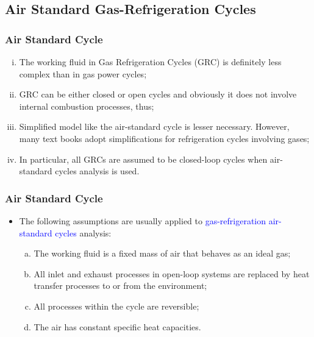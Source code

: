 \documentclass[10pt,compress]{beamer}
\begin{document}
\subsection{Air Standard Gas-Refrigeration Cycles}
\begin{frame}
 \frametitle{Air Standard Cycle}
  \begin{enumerate}[(i)]
   \item <1-> The working fluid in Gas Refrigeration Cycles (GRC) is definitely less complex than in gas power cycles;
   \item <2-> GRC can be either closed or open cycles and obviously it does not involve internal combustion processes, thus;
   \item <3-> Simplified model like the air-standard cycle is lesser necessary. However, many text books adopt simplifications for refrigeration cycles involving gases;
   \item <4-> In particular, all GRCs are assumed to be closed-loop cycles when air-standard cycles analysis is used.
  \end{enumerate}
\end{frame}

\begin{frame}
 \frametitle{Air Standard Cycle}
   \begin{itemize}
   \item <1-> The following assumptions are usually applied to \textcolor{blue}{gas-refrigeration air-standard cycles} analysis:
  \begin{enumerate}[(a)]
   \item <2-> The working fluid is a fixed mass of air that behaves as an ideal gas;
   \item <3-> All inlet and exhaust processes in open-loop systems are replaced by heat transfer processes to or from the environment;
   \item <4-> All processes within the cycle are reversible;
   \item <5-> The air has constant specific heat capacities.
  \end{enumerate}
 \end{itemize}
\end{frame}
\end{document}
